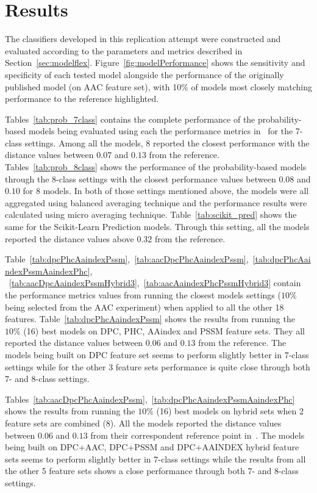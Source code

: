 \chapter{Results}

The classifiers developed in this replication attempt were constructed and evaluated according to the parameters
and metrics described in Section~\ref{sec:modelflex}. Figure~\ref{fig:modelPerformance} shows the sensitivity 
and specificity of each tested model alongside the performance of the originally published model (on AAC feature set), 
with 10\% of models most closely matching performance to the reference highlighted.

Tables~\ref{tab:prob_7class} contains the complete performance of the probability-based models
being evaluated using each the performance metrics in~\cite{mishra_prediction_2014} for the 7-class settings. 
Among all the models, 8 reported the closest performance with the distance values between $0.07$ and $0.13$
from the reference. Tables~\ref{tab:prob_8class} shows the performance of the probability-based models through the 
8-class settings with the closest performance values between $0.08$ and $0.10$ for 8 models. 
In both of those settings mentioned above, the models were all aggregated using balanced averaging technique and 
the performance results were calculated using micro averaging technique. 
Table~\ref{tab:scikit_pred} shows the same for the Scikit-Learn Prediction models. Through this setting, 
all the models reported the distance values above $0.32$ from the reference.

Table~\ref{tab:dpcPhcAaindexPssm},~\ref{tab:aacDpcPhcAaindexPssm},~\ref{tab:dpcPhcAaindexPssmAaindexPhc},
~\ref{tab:aacDpcAaindexPssmHybrid3},~\ref{tab:aacAaindexPhcPssmHybrid3}
contain the performance metrics values from running the closest models settings ($10\%$ being selected from 
the AAC experiment) when applied to all the other 18 features. 
Table~\ref{tab:dpcPhcAaindexPssm} shows the results from running the $10\%$ (16) best models on DPC, PHC, 
AAindex and PSSM feature sets. They all reported the distance values between $0.06$ and $0.13$ from the reference. 
The models being built on DPC feature set seems to perform slightly better in 7-class settings while for the 
other 3 feature sets performance is quite close through both 7- and 8-class settings.

Tables~\ref{tab:aacDpcPhcAaindexPssm},~\ref{tab:dpcPhcAaindexPssmAaindexPhc} shows the results from running 
the $10\%$ (16) best models on hybrid sets when 2 feature sets are combined (8). All the models reported 
the distance values between $0.06$ and $0.13$ from their correspondent reference point in~\cite{mishra_prediction_2014}. 
The models being built on DPC+AAC, DPC+PSSM and DPC+AAINDEX hybrid feature sets seems to perform slightly better 
in 7-class settings while the results from all the other 5 feature sets shows a close performance through 
both 7- and 8-class settings.

